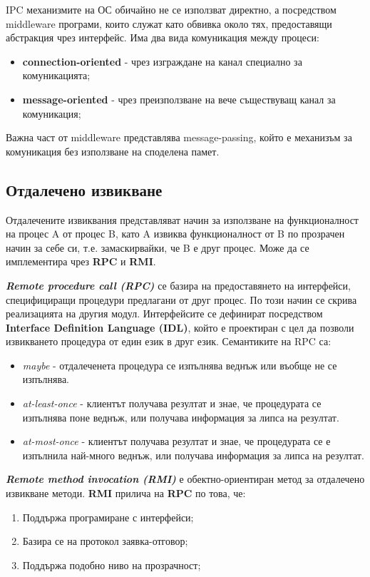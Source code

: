 \documentclass[fleqn,12pt]{article}
\begin{document}
IPC механизмите на ОС обичайно не се използват директно, а посредством middleware програми, които служат като обвивка около тях, предоставящи абстракция чрез интерфейс.
Има два вида комуникация между процеси:
\begin{itemize}
    \item \textbf{connection-oriented} - чрез изграждане на канал специално за комуникацията;
    \item \textbf{message-oriented} - чрез преизползване на вече съществуващ канал за комуникация; 
\end{itemize}

Важна част от middleware представлява message-passing, който е механизъм за комуникация без използване на споделена памет.

\subsection{Отдалечено извикване}

Отдалечените извиквания представляват начин за използване на функционалност на процес A от процес B, като A извиква функционалност от B по прозрачен начин за себе си, т.е. замаскирвайки, че B е друг процес.
Може да се имплементира чрез \textbf{RPC} и \textbf{RMI}.
\bigbreak

\textbf{\textit{Remote procedure call (RPC)}} се базира на предоставянето на интерфейси, специфициращи процедури предлагани от друг процес.
По този начин се скрива реализацията на другия модул.
Интерфейсите се дефинират посредством \textbf{Interface Definition Language (IDL)}, който е проектиран с цел да позволи извикването процедура от един език в друг език.
\bigbreak
Семантиките на RPC са:
\begin{itemize}
    \item \textit{maybe} - отдалеченета процедура се изпълнява веднъж или въобще не се изпълнява.
    \item \textit{at-least-once} - клиентът получава резултат и знае, че процедурата се изпълнява поне веднъж, или получава информация за липса на резултат.
    \item \textit{at-most-once} - клиентът получава резултат и знае, че процедурата се е изпълнила най-много веднъж, или получава информация за липса на резултат.
\end{itemize}

\textbf{\textit{Remote method invocation (RMI)}} е обектно-ориентиран метод за отдалечено извикване методи.
\bigbreak
\textbf{RMI} прилича на \textbf{RPC} по това, че:
\begin{enumerate}
    \item Поддържа програмиране с интерфейси;
    \item Базира се на протокол заявка-отговор;
    \item Поддържа подобно ниво на прозрачност;
\end{enumerate}
\end{document}
